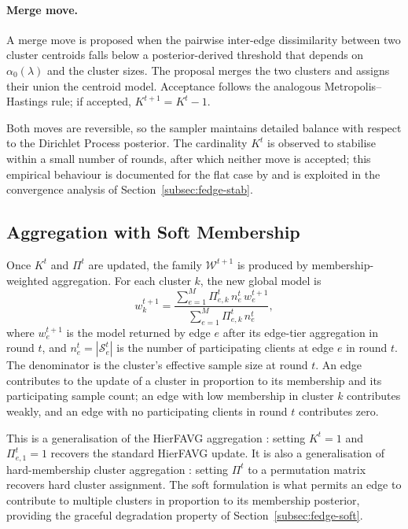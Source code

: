 \paragraph{Merge move.}
A merge move is proposed when the pairwise inter-edge dissimilarity between two cluster centroids falls below a posterior-derived threshold that depends on $\alpha_0(\lambda)$ and the cluster sizes. The proposal merges the two clusters and assigns their union the centroid model. Acceptance follows the analogous Metropolis--Hastings rule; if accepted, $K^{t+1} = K^t - 1$.

Both moves are reversible, so the sampler maintains detailed balance with respect to the Dirichlet Process posterior. The cardinality $K^t$ is observed to stabilise within a small number of rounds, after which neither move is accepted; this empirical behaviour is documented for the flat case by \cite{jaramillo2026dpmmcfl} and is exploited in the convergence analysis of Section~\ref{subsec:fedge-stab}.

\subsection{Aggregation with Soft Membership}
\label{subsec:fedge-agg}

Once $K^t$ and $\Pi^t$ are updated, the family $\mathcal{W}^{t+1}$ is produced by membership-weighted aggregation. For each cluster $k$, the new global model is
\begin{equation}
\label{eq:agg}
w_{k}^{t+1} = \frac{ \sum_{e=1}^{M} \Pi_{e,k}^{t} \, n_{e}^{t} \, w_{e}^{t+1} }{ \sum_{e=1}^{M} \Pi_{e,k}^{t} \, n_{e}^{t} },
\end{equation}
where $w_e^{t+1}$ is the model returned by edge $e$ after its edge-tier aggregation in round $t$, and $n_e^t = |\mathcal{S}_e^t|$ is the number of participating clients at edge $e$ in round $t$. The denominator is the cluster's effective sample size at round $t$. An edge contributes to the update of a cluster in proportion to its membership and its participating sample count; an edge with low membership in cluster $k$ contributes weakly, and an edge with no participating clients in round $t$ contributes zero.

This is a generalisation of the HierFAVG aggregation \cite{liu2020hierfavg}: setting $K^t = 1$ and $\Pi_{e,1}^t = 1$ recovers the standard HierFAVG update. It is also a generalisation of hard-membership cluster aggregation \cite{sattler2020clustered, ghosh2022efficient}: setting $\Pi^t$ to a permutation matrix recovers hard cluster assignment. The soft formulation is what permits an edge to contribute to multiple clusters in proportion to its membership posterior, providing the graceful degradation property of Section~\ref{subsec:fedge-soft}.


